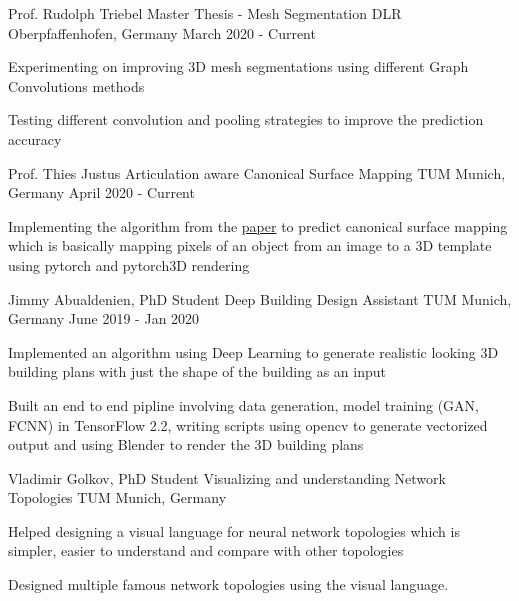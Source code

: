 
\begin{cventries}
	
	\cventry
	{Prof. Rudolph Triebel} %
	{Master Thesis - Mesh Segmentation} %
	{DLR Oberpfaffenhofen, Germany} %
	{March 2020 - Current} %
	{
		\begin{cvitems} %
			\item {Experimenting on improving 3D mesh segmentations using different Graph Convolutions methods}
			\item {Testing different convolution and pooling strategies to improve the prediction accuracy}
		\end{cvitems}
	}

	\cventry
	{Prof. Thies Justus} %
	{Articulation aware Canonical Surface Mapping} %
	{TUM Munich, Germany} %
	{April 2020 - Current} %
	{
		\begin{cvitems} %
			\item {Implementing the algorithm from the \href{https://arxiv.org/abs/2004.00614}{paper} to predict canonical surface mapping which is basically mapping pixels of an object from an image to a 3D template using pytorch and pytorch3D rendering}
		\end{cvitems}
	}

	\cventry
	{Jimmy Abualdenien, PhD Student} %
	{Deep Building Design Assistant} %
	{TUM Munich, Germany} %
	{June 2019 - Jan 2020} %
	{
		\begin{cvitems} %
			\item {Implemented an algorithm using Deep Learning to generate realistic looking 3D building plans with just the shape of the building as an input}
			\item {Built an end to end pipline involving data generation, model training (GAN, FCNN) in TensorFlow 2.2, writing scripts using opencv to generate vectorized output and using Blender to render the 3D building plans}
		\end{cvitems}
	}
	
	\cventry
	{Vladimir Golkov, PhD Student} %
	{Visualizing and understanding Network Topologies} %
	{TUM Munich, Germany} %
	{} %
	{
		\begin{cvitems} %
			\item {Helped designing a visual language for neural network topologies which is simpler, easier to understand and compare with other topologies}
			\item {Designed multiple famous network topologies using the visual language.}
		\end{cvitems}
	}
	

\end{cventries}
